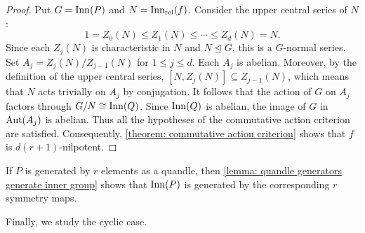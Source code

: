 
\begin{proof}
    Put $G=\operatorname{Inn}(P)$ and $N=\operatorname{Inn_{rel}}(f)$. Consider the upper central series of \(N\):
    \[ 1=Z_0(N)\leq Z_1(N)\leq\cdots\leq Z_d(N)=N. \]
    Since each \(Z_j(N)\) is characteristic in \(N\) and \(N\trianglelefteq G\), this is a \(G\)-normal series. Set $ A_j=Z_j(N)/Z_{j-1}(N)$ for $1\leq j\leq d$. Each \(A_j\) is abelian. Moreover, by the definition of the upper central series, $[N,Z_j(N)]\subseteq Z_{j-1}(N)$, which means that \(N\) acts trivially on \(A_j\) by conjugation. It follows that the action of \(G\) on \(A_j\) factors through $G/N\cong \operatorname{Inn}(Q)$.
    Since \(\operatorname{Inn}(Q)\) is abelian, the image of \(G\) in \(\operatorname{Aut}(A_j)\) is abelian. Thus all the hypotheses of the commutative action criterion are satisfied. Consequently, \cref{theorem: commutative action criterion} shows that $f$ is $d(r+1)$-nilpotent.
\end{proof}





If $P$ is generated by $r$ elements as a quandle, then \cref{lemma: quandle generators generate inner group} shows that $\operatorname{Inn}(P)$ is generated by the corresponding $r$ symmetry maps.


Finally, we study the cyclic case.



